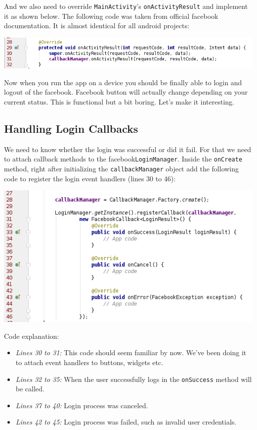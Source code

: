 And we also need to override \texttt{MainActivity}'s \texttt{onActivityResult} and implement it as shown below. The following code was taken from official facebook documentation. It is almost identical for all android projects:

\begin{center}
	\includegraphics[scale=\SourceCodeScale]{chapters/ch12/images/25}
\end{center}

Now when you run the app on a device you should be finally able to login and logout of the facebook. Facebook button will actually change depending on your current status. This is functional but a bit boring. Let's make it interesting.

\subsection{Handling Login Callbacks}
We need to know whether the login was successful or did it fail. For that we need to attach callback methods to the facebook\texttt{LoginManager}. Inside the \texttt{onCreate} method, right after initializing the \texttt{callbackManager} object add the following code to register the login event handlers (lines 30 to 46):

\begin{center}
	\includegraphics[scale=\SourceCodeScale]{chapters/ch12/images/26}
\end{center}

Code explanation:
\begin{itemize}
	\item \textit{Lines 30 to 31:} This code should seem familiar by now. We've been doing it to attach event handlers to buttons, widgets etc. 
	
	\item \textit{Lines 32 to 35:} When the user successfully logs in the \texttt{onSuccess} method will be called.
	
	\item \textit{Lines 37 to 40:} Login process was canceled.
	
	\item \textit{Lines 42 to 45:} Login process was failed, such as invalid user credentials.
	
\end{itemize}

